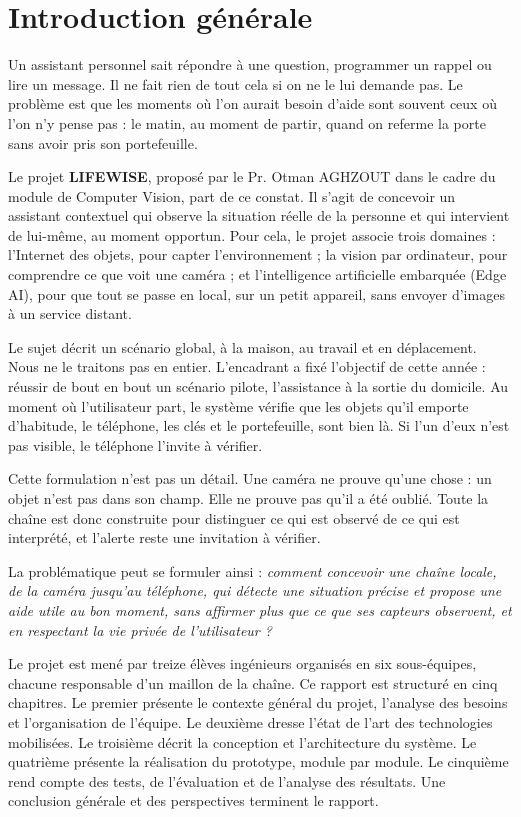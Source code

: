 \chapter*{\textcolor{mycolor}{Introduction générale}}

Un assistant personnel sait répondre à une question, programmer un rappel ou lire un message. Il ne fait rien de
tout cela si on ne le lui demande pas. Le problème est que les moments où l'on aurait besoin d'aide sont souvent
ceux où l'on n'y pense pas : le matin, au moment de partir, quand on referme la porte sans avoir pris son
portefeuille.

Le projet \textbf{LIFEWISE}, proposé par le Pr. Otman AGHZOUT dans le cadre du module de Computer Vision, part de ce
constat. Il s'agit de concevoir un assistant contextuel qui observe la situation réelle de la personne et qui
intervient de lui-même, au moment opportun. Pour cela, le projet associe trois domaines : l'Internet des objets,
pour capter l'environnement ; la vision par ordinateur, pour comprendre ce que voit une caméra ; et l'intelligence
artificielle embarquée (Edge AI), pour que tout se passe en local, sur un petit appareil, sans envoyer d'images à un
service distant.

Le sujet décrit un scénario global, à la maison, au travail et en déplacement. Nous ne le traitons pas en entier.
L'encadrant a fixé l'objectif de cette année : réussir de bout en bout un scénario pilote, l'assistance à la
sortie du domicile. Au moment où l'utilisateur part, le système vérifie que les objets qu'il emporte d'habitude,
le téléphone, les clés et le portefeuille, sont bien là. Si l'un d'eux n'est pas visible, le téléphone l'invite à
vérifier.

Cette formulation n'est pas un détail. Une caméra ne prouve qu'une chose : un objet n'est pas dans son champ. Elle
ne prouve pas qu'il a été oublié. Toute la chaîne est donc construite pour distinguer ce qui est observé de ce qui
est interprété, et l'alerte reste une invitation à vérifier.

La problématique peut se formuler ainsi : \textit{comment concevoir une chaîne locale, de la caméra jusqu'au
téléphone, qui détecte une situation précise et propose une aide utile au bon moment, sans affirmer plus que ce
que ses capteurs observent, et en respectant la vie privée de l'utilisateur ?}

Le projet est mené par treize élèves ingénieurs organisés en six sous-équipes, chacune responsable d'un maillon
de la chaîne. Ce rapport est structuré en cinq chapitres. Le premier présente le contexte général du projet,
l'analyse des besoins et l'organisation de l'équipe. Le deuxième dresse l'état de l'art des technologies
mobilisées. Le troisième décrit la conception et l'architecture du système. Le quatrième présente la réalisation
du prototype, module par module. Le cinquième rend compte des tests, de l'évaluation et de l'analyse des résultats.
Une conclusion générale et des perspectives terminent le rapport.
